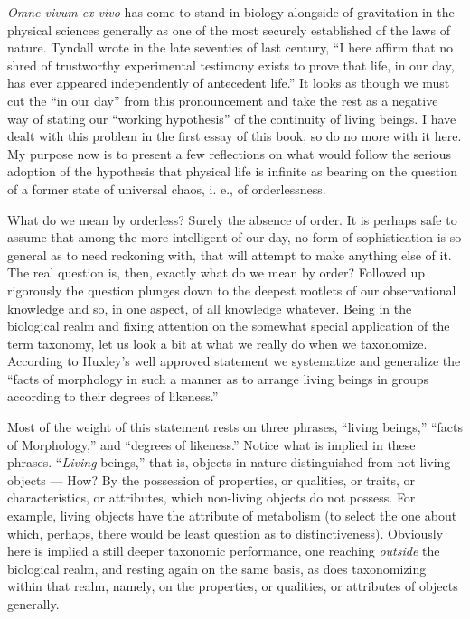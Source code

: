 \documentclass[a4paper, 11pt, oneside, polutonikogreek, english, landscape]{article}
\begin{document}
\emph{Omne vivum ex vivo} has come to stand in biology alongside of gravitation in the physical sciences generally as one of the most securely established of the laws of nature. Tyndall wrote in the late seventies of last century, ``I here affirm that no shred of trustworthy experimental testimony exists to prove that life, in our day, has ever appeared independently of antecedent life.'' It looks as though we must cut the ``in our day'' from this pronouncement and take the rest as a negative way of stating our ``working hypothesis'' of the continuity of living beings. I have dealt with this problem in the first essay of this book, so do no more with it here. My purpose now is to present a few reflections on what would follow the serious adoption of the hypothesis that physical life is infinite as bearing on the question of a former state of universal chaos, i. e., of orderlessness.

What do we mean by orderless? Surely the absence of order. It is perhaps safe to assume that among the more intelligent of our day, no form of sophistication is so general as to need reckoning with, that will attempt to make anything else of it. The real question is, then, exactly what do we mean by order? Followed up rigorously the question plunges down to the deepest rootlets of our observational knowledge and so, in one aspect, of all knowledge whatever. Being in the biological realm and fixing attention on the somewhat special application of the term taxonomy, let us look a bit at what we really do when we taxonomize. According to Huxley's well approved statement we systematize and generalize the ``facts of morphology in such a manner as to arrange living beings in groups according to their degrees of likeness.''

Most of the weight of this statement rests on three phrases, ``living beings,'' ``facts of Morphology,'' and ``degrees of likeness.'' Notice what is implied in these phrases. ``\emph{Living} beings,'' that is, objects in nature distinguished from not-living objects --- How? By the possession of properties, or qualities, or traits, or characteristics, or attributes, which non-living objects do not possess. For example, living objects have the attribute of metabolism (to select the one about which, perhaps, there would be least question as to distinctiveness). Obviously here is implied a still deeper taxonomic performance, one reaching \emph{outside} the biological realm, and resting again on the same basis, as does taxonomizing within that realm, namely, on the properties, or qualities, or attributes of objects generally.
\end{document}
